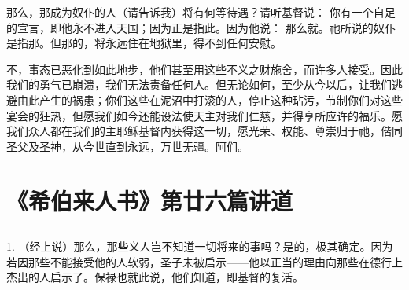 那么，那成为奴仆的人（请告诉我）将有何等待遇？请听基督说：  你有一个自足的宣言，即他永不进入天国；因为正是指此。因为他说：  那么就。祂所说的奴仆是指那。但那的，将永远住在地狱里，得不到任何安慰。\par

不，事态已恶化到如此地步，他们甚至用这些不义之财施舍，而许多人接受。因此我们的勇气已崩溃，我们无法责备任何人。但无论如何，至少从今以后，让我们逃避由此产生的祸患；你们这些在泥沼中打滚的人，停止这种玷污，节制你们对这些宴会的狂热，但愿我们如今还能设法使天主对我们仁慈，并得享所应许的福乐。愿我们众人都在我们的主耶稣基督内获得这一切，愿光荣、权能、尊崇归于祂，偕同圣父及圣神，从今世直到永远，万世无疆。阿们。\par



\section{《希伯来人书》第廿六篇讲道}


\subsection{}

\par

1. （经上说）那么，那些义人岂不知道一切将来的事吗？是的，极其确定。因为若因那些不能接受他的人软弱，圣子未被启示——他以正当的理由向那些在德行上杰出的人启示了。保禄也就此说，他们知道，即基督的复活。\par


